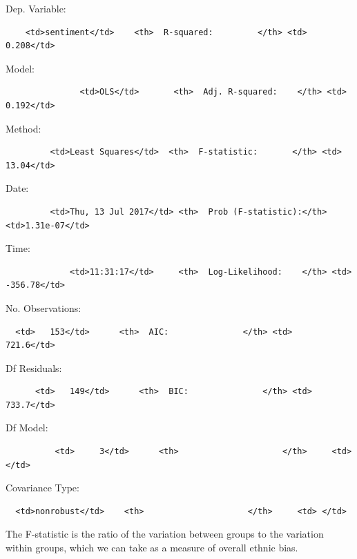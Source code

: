 \documentclass[]{book}
\theoremstyle{definition}
\theoremstyle{definition}
\theoremstyle{definition}
\theoremstyle{remark}
\begin{document}
Dep. Variable:

\begin{verbatim}
    <td>sentiment</td>    <th>  R-squared:         </th> <td>   0.208</td>
\end{verbatim}

Model:

\begin{verbatim}
               <td>OLS</td>       <th>  Adj. R-squared:    </th> <td>   0.192</td>
\end{verbatim}

Method:

\begin{verbatim}
         <td>Least Squares</td>  <th>  F-statistic:       </th> <td>   13.04</td>
\end{verbatim}

Date:

\begin{verbatim}
         <td>Thu, 13 Jul 2017</td> <th>  Prob (F-statistic):</th> <td>1.31e-07</td>
\end{verbatim}

Time:

\begin{verbatim}
             <td>11:31:17</td>     <th>  Log-Likelihood:    </th> <td> -356.78</td>
\end{verbatim}

No. Observations:

\begin{verbatim}
  <td>   153</td>      <th>  AIC:               </th> <td>   721.6</td>
\end{verbatim}

Df Residuals:

\begin{verbatim}
      <td>   149</td>      <th>  BIC:               </th> <td>   733.7</td>
\end{verbatim}

Df Model:

\begin{verbatim}
          <td>     3</td>      <th>                     </th>     <td> </td>   
\end{verbatim}

Covariance Type:

\begin{verbatim}
  <td>nonrobust</td>    <th>                     </th>     <td> </td>   
\end{verbatim}

The F-statistic is the ratio of the variation between groups to the
variation within groups, which we can take as a measure of overall
ethnic bias.
\end{document}
